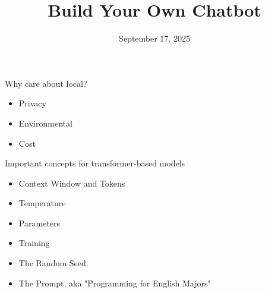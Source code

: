 \documentclass{beamer}
\title{Build Your Own Chatbot}
\date{September 17, 2025}
\begin{document}
\begin{frame}
	\maketitle
\end{frame}

\begin{frame}
	Why care about local?
\end{frame}

\begin{frame}
	\begin{itemize}
		\item Privacy
		\pause
		\item Environmental
		\pause
		\item Cost
	\end{itemize}
\end{frame}

\begin{frame}[plain]
\end{frame}

\begin{frame}[plain]
\end{frame}


\begin{frame}{Important concepts for transformer-based models}
	\begin{itemize}
		\item Context Window and Tokens
		\pause
		\item Temperature
		\pause
		\item Parameters
		\pause
		\item Training
		\pause 
		\item The Random Seed.
		\pause
		\item The Prompt, aka "Programming for English Majors"
	\end{itemize}
\end{frame}

\begin{frame}[plain]
\end{frame}
\end{document}
